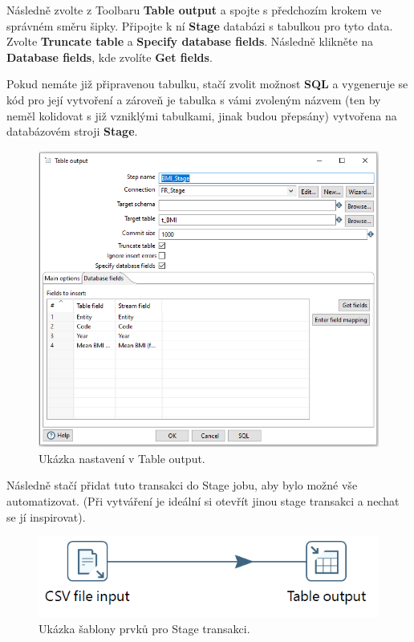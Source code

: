 \documentclass[thesis=M,czech]{FITthesis}[2022/10/08]
\begin{document}
Následně zvolte z Toolbaru \textbf{Table output} a spojte s předchozím krokem ve správném směru šipky. Připojte k ní \textbf{Stage} databázi s tabulkou pro tyto data. Zvolte \textbf{Truncate table} a \textbf{Specify database fields}. Následně klikněte na \textbf{Database fields}, kde zvolíte \textbf{Get fields}. 

Pokud nemáte již připravenou tabulku, stačí zvolit možnost \textbf{SQL} a vygeneruje se kód pro její vytvoření a zároveň je tabulka s vámi zvoleným názvem (ten by neměl kolidovat s již vzniklými tabulkami, jinak budou přepsány) vytvořena na databázovém stroji \textbf{Stage}.

\begin{figure}
    \centering
    \includegraphics[width=\textwidth]{DP-obrazky/table_output.png}
    \caption{Ukázka nastavení v Table output.}
    \label{fig:Table_output}
\end{figure}

Následně stačí přidat tuto transakci do Stage jobu, aby bylo možné vše automatizovat. (Při vytváření je ideální si otevřít jinou stage transakci a nechat se jí inspirovat).

\begin{figure}
    \centering
    \includegraphics[width=\textwidth]{DP-obrazky/Stage_sablona.png}
    \caption{Ukázka šablony prvků pro Stage transakci.}
    \label{fig:Stage_šablona}
\end{figure}
\end{document}
